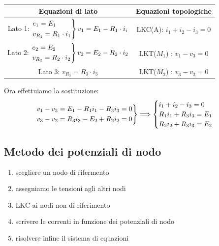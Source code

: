 \documentclass{article}
\begin{document}
\begin{center}
\begin{tabular}{c|c}
    Equazioni di lato & Equazioni topologiche\\
    \hline
    Lato 1:
    $
    \begin{rcases}
        e_1=E_1\\
        v_{R_1} = R_1 \cdot i_1 
    \end{rcases}
    v_1 = E_1 - R_1 \cdot i_i$
    &
    LKC(A): $i_1+i_2-i_3=0$\\
    Lato 2: 
    $
    \begin{rcases}
        e_2 = E_2\\
        v_{R_2} = R_2 \cdot i_2
    \end{rcases}
    v_2 = E_2 - R_2 \cdot i_2
    $
    &
    LKT($M_1$) : $v_1 - v_3=0$\\
    Lato 3: $v_{R_3} = R_3 \cdot i_3$ 
    &
    LKT($M_2$) : $v_3-v_2=0$    
\end{tabular}
\end{center}
Ora effettuiamo la sostituzione:
\[
    \begin{rcases}
        v_1 - v_3 = E_1-R_1i_1 - R_3i_3=0\\
        v_3 - v_2 = R_3i_3 - E_2 + R_2i_2=0
    \end{rcases}
    \Longrightarrow
    \begin{cases}
        i_1+i_2-i_3=0\\
        R_1i_1+R_3i_3=E_1\\
        R_2i_2+R_3i_3=E_2
    \end{cases}
\]







\subsection{Metodo dei potenziali di nodo}
\begin{enumerate}
    \item scegliere un nodo di rifermento
    \item assegniamo le tensioni agli altri nodi
    \item LKC ai nodi non di riferimento
    \item scrivere le correnti in funzione dei potenziali di nodo
    \item risolvere infine il sistema di equazioni
\end{enumerate}
\end{document}
